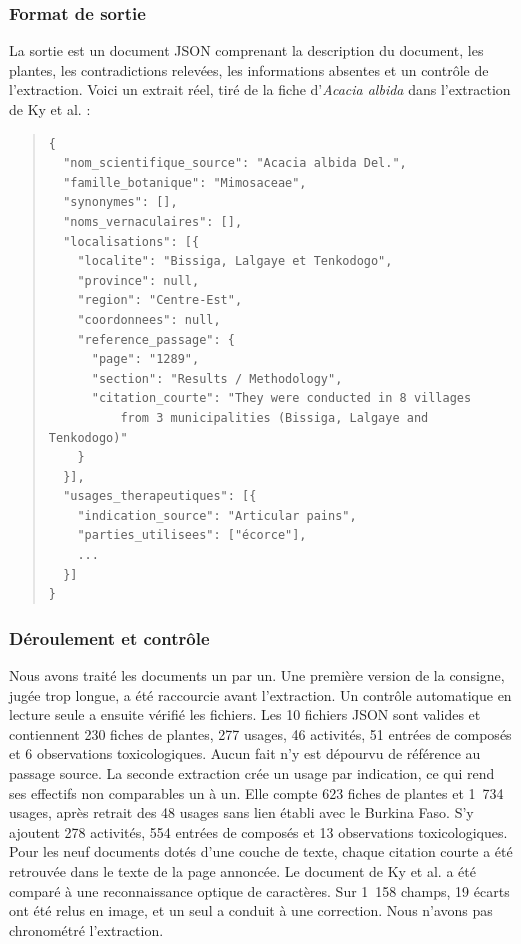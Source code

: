 \subsubsection{Format de sortie}

La sortie est un document JSON comprenant la description du document, les plantes, les contradictions relevées, les informations absentes et un contrôle de l'extraction. Voici un extrait réel, tiré de la fiche d'\textit{Acacia albida} dans l'extraction de Ky et al. :

\begin{quote}
\begin{verbatim}
{
  "nom_scientifique_source": "Acacia albida Del.",
  "famille_botanique": "Mimosaceae",
  "synonymes": [],
  "noms_vernaculaires": [],
  "localisations": [{
    "localite": "Bissiga, Lalgaye et Tenkodogo",
    "province": null,
    "region": "Centre-Est",
    "coordonnees": null,
    "reference_passage": {
      "page": "1289",
      "section": "Results / Methodology",
      "citation_courte": "They were conducted in 8 villages
          from 3 municipalities (Bissiga, Lalgaye and Tenkodogo)"
    }
  }],
  "usages_therapeutiques": [{
    "indication_source": "Articular pains",
    "parties_utilisees": ["écorce"],
    ...
  }]
}
\end{verbatim}
\end{quote}

\subsubsection{Déroulement et contrôle}

Nous avons traité les documents un par un. Une première version de la consigne, jugée trop longue, a été raccourcie avant l'extraction. Un contrôle automatique en lecture seule a ensuite vérifié les fichiers. Les 10 fichiers JSON sont valides et contiennent 230 fiches de plantes, 277 usages, 46 activités, 51 entrées de composés et 6 observations toxicologiques. Aucun fait n'y est dépourvu de référence au passage source. La seconde extraction crée un usage par indication, ce qui rend ses effectifs non comparables un à un. Elle compte 623 fiches de plantes et 1~734 usages, après retrait des 48 usages sans lien établi avec le Burkina Faso. S'y ajoutent 278 activités, 554 entrées de composés et 13 observations toxicologiques. Pour les neuf documents dotés d'une couche de texte, chaque citation courte a été retrouvée dans le texte de la page annoncée. Le document de Ky et al. a été comparé à une reconnaissance optique de caractères. Sur 1~158 champs, 19 écarts ont été relus en image, et un seul a conduit à une correction. Nous n'avons pas chronométré l'extraction.

